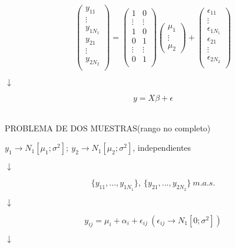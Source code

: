 \documentclass[10pt,a4paper]{book}
\begin{document}
$$ \left( \begin{array}{c}
y_{11}\\
\vdots\\
y_{1N_1}\\
\hline
y_{21}\\
\vdots\\
y_{2N_2}\\
\end{array} \right) =  
\left( \begin{array}{cc}
1 & 0\\
\vdots & \vdots\\
1 & 0\\
\hline
0 & 1\\
\vdots & \vdots\\
0 & 1\\
\end{array} \right)
\left( \begin{array}{c}
\mu_1\\
\vdots\\
\mu_2 \end{array} \right) + 
\left( \begin{array}{c}
\epsilon_{11}\\
\vdots\\
\epsilon_{1N_1}\\
\hline
\epsilon_{21}\\
\vdots\\
\epsilon_{2N_2}\\
\end{array} \right)$$
\begin{center}
$ \downarrow $
\end{center}
$$y=X\beta+\epsilon$$
\ \\
\begin{center}
PROBLEMA DE DOS MUESTRAS(rango no completo)
\end{center}
\begin{center}
$y_1 \rightarrow N_1[\mu_1;\sigma^2];\ y_2 \rightarrow N_1[\mu_2;\sigma^2]$, independientes
\end{center}
\begin{center}
$ \downarrow $
\end{center}
$$\{y_{11},...,y_{1N_1}\},\ \{y_{21},...,y_{2N_2}\}\ m.a.s.$$
\begin{center}
$ \downarrow $
\end{center}
$$y_{ij}=\mu_i + \alpha_i + \epsilon_{ij}\  (\epsilon_{ij} \rightarrow N_1[0;\sigma^2])$$
\begin{center}
$ \downarrow $
\end{center}
\end{document}
